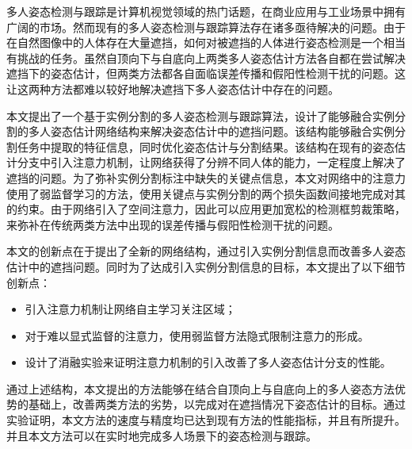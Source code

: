 \begin{cabstract}
  多人姿态检测与跟踪是计算机视觉领域的热门话题，在商业应用与工业场景中拥有广阔的市场。然而现有的多人姿态检测与跟踪算法存在诸多亟待解决的问题。由于在自然图像中的人体存在大量遮挡，如何对被遮挡的人体进行姿态检测是一个相当有挑战的任务。虽然自顶向下与自底向上两类多人姿态估计方法各自都在尝试解决遮挡下的姿态估计，但两类方法都各自面临误差传播和假阳性检测干扰的问题。这让这两种方法都难以较好地解决遮挡下多人姿态估计中存在的问题。
  
  本文提出了一个基于实例分割的多人姿态检测与跟踪算法，设计了能够融合实例分割的多人姿态估计网络结构来解决姿态估计中的遮挡问题。该结构能够融合实例分割任务中提取的特征信息，同时优化姿态估计与分割结果。该结构在现有的姿态估计分支中引入注意力机制，让网络获得了分辨不同人体的能力，一定程度上解决了遮挡的问题。为了弥补实例分割标注中缺失的关键点信息，本文对网络中的注意力使用了弱监督学习的方法，使用关键点与实例分割的两个损失函数间接地完成对其的约束。由于网络引入了空间注意力，因此可以应用更加宽松的检测框剪裁策略，来弥补在传统两类方法中出现的误差传播与假阳性检测干扰的问题。
  
本文的创新点在于提出了全新的网络结构，通过引入实例分割信息而改善多人姿态估计中的遮挡问题。同时为了达成引入实例分割信息的目标，本文提出了以下细节创新点：
\begin{itemize}
 	\item 引入注意力机制让网络自主学习关注区域；
 	\item 对于难以显式监督的注意力，使用弱监督方法隐式限制注意力的形成。
 	\item 设计了消融实验来证明注意力机制的引入改善了多人姿态估计分支的性能。
\end{itemize}
  
  通过上述结构，本文提出的方法能够在结合自顶向上与自底向上的多人姿态方法优势的基础上，改善两类方法的劣势，以完成对在遮挡情况下姿态估计的目标。通过实验证明，本文方法的速度与精度均已达到现有方法的性能指标，并且有所提升。并且本文方法可以在实时地完成多人场景下的姿态检测与跟踪。

\end{cabstract}


